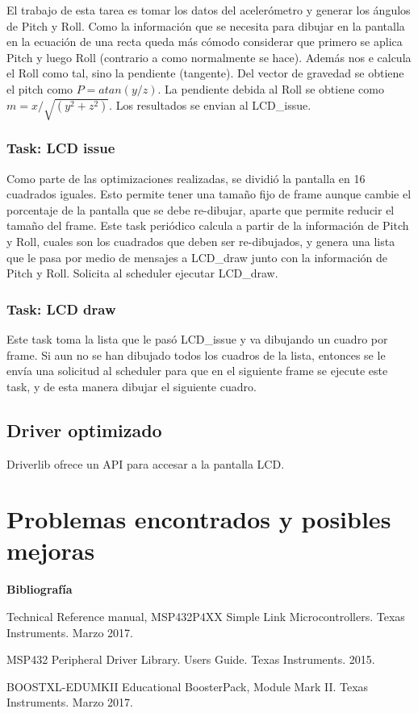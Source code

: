 El trabajo de esta tarea es tomar los datos del acelerómetro y generar los ángulos de Pitch y
Roll. Como la información que se necesita para dibujar en la pantalla en la ecuación de una recta
queda más cómodo considerar que primero se aplica Pitch y luego Roll (contrario a como normalmente se
hace). Además nos e calcula el Roll como tal, sino la pendiente (tangente). Del vector de gravedad
se obtiene el pitch como $P = atan(y/z)$. La pendiente debida al Roll se obtiene como $m =
x/\sqrt{(y^2+z^2)}$. Los resultados se envian al LCD\_issue. 

\subsubsection{Task: LCD issue}
\label{sec:lcd_issue}

Como parte de las optimizaciones realizadas, se dividió la pantalla en 16 cuadrados iguales. Esto
permite tener una tamaño fijo de frame aunque cambie el porcentaje de la pantalla que se debe
re-dibujar, aparte que permite reducir el tamaño del frame. Este task periódico calcula a partir de
la información de Pitch y Roll, cuales son los cuadrados que deben ser re-dibujados, y genera una
lista que le pasa por medio de mensajes a LCD\_draw junto con la información de Pitch y
Roll. Solicita al scheduler ejecutar LCD\_draw.
\subsubsection{Task: LCD draw}
\label{sec:lcd_draw}
Este task toma la lista que le pasó LCD\_issue y va dibujando un cuadro por frame. Si aun no se han
dibujado todos los cuadros de la lista, entonces se le envía una solicitud al scheduler para que en el
siguiente frame se ejecute este task, y de esta manera dibujar el siguiente cuadro. 

\subsection{Driver optimizado}
Driverlib ofrece un API para accesar a la pantalla LCD. 

\section{Problemas encontrados y posibles mejoras}


\textbf{ Bibliografía}

Technical Reference manual, MSP432P4XX Simple Link Microcontrollers. Texas Instruments. Marzo 2017.

MSP432 Peripheral Driver Library. Users Guide. Texas Instruments. 2015.

BOOSTXL-EDUMKII Educational BoosterPack, Module Mark II. Texas Instruments. Marzo 2017.


%
%

